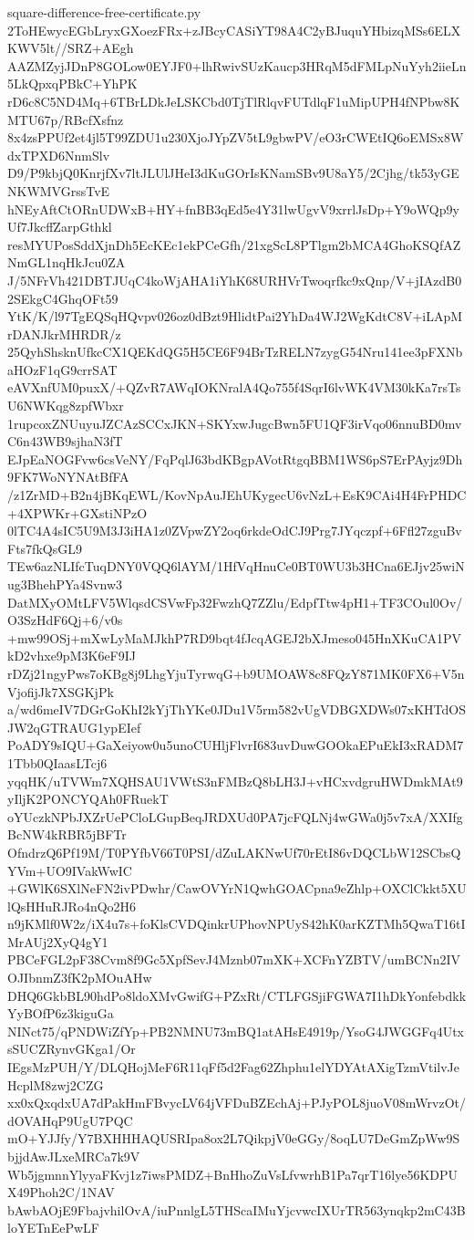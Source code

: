 \documentclass[11pt]{article}
\theoremstyle{definition}
\theoremstyle{remark}
\begin{document}
\begin{filecontents*}[overwrite]{square-difference-free-certificate.py}
2ToHEwycEGbLryxGXoezFRx+zJBcyCASiYT98A4C2yBJuquYHbizqMSs6ELXKWV5lt//SRZ+AEgh
AAZMZyjJDnP8GOLow0EYJF0+lhRwivSUzKaucp3HRqM5dFMLpNuYyh2iieLn5LkQpxqPBkC+YhPK
rD6c8C5ND4Mq+6TBrLDkJeLSKCbd0TjTlRlqvFUTdlqF1uMipUPH4fNPbw8KMTU67p/RBcfXsfnz
8x4zsPPUf2et4jl5T99ZDU1u230XjoJYpZV5tL9gbwPV/eO3rCWEtIQ6oEMSx8WdxTPXD6NnmSlv
D9/P9kbjQ0KnrjfXv7ltJLUlJHeI3dKuGOrIsKNamSBv9U8aY5/2Cjhg/tk53yGENKWMVGrssTvE
hNEyAftCtORnUDWxB+HY+fnBB3qEd5e4Y31lwUgvV9xrrlJsDp+Y9oWQp9yUf7JkcffZarpGthkl
resMYUPosSddXjnDh5EcKEc1ekPCeGfh/21xgScL8PTlgm2bMCA4GhoKSQfAZNmGL1nqHkJcu0ZA
J/5NFrVh421DBTJUqC4koWjAHA1iYhK68URHVrTwoqrfkc9xQnp/V+jIAzdB02SEkgC4GhqOFt59
YtK/K/l97TgEQSqHQvpv026oz0dBzt9HlidtPai2YhDa4WJ2WgKdtC8V+iLApMrDANJkrMHRDR/z
25QyhShsknUfkcCX1QEKdQG5H5CE6F94BrTzRELN7zygG54Nru141ee3pFXNbaHOzF1qG9crrSAT
eAVXnfUM0puxX/+QZvR7AWqIOKNralA4Qo755f4SqrI6lvWK4VM30kKa7rsTsU6NWKqg8zpfWbxr
1rupcoxZNUuyuJZCAzSCCxJKN+SKYxwJugcBwn5FU1QF3irVqo06nnuBD0mvC6n43WB9sjhaN3fT
EJpEaNOGFvw6csVeNY/FqPqlJ63bdKBgpAVotRtgqBBM1WS6pS7ErPAyjz9Dh9FK7WoNYNAtBfFA
/z1ZrMD+B2n4jBKqEWL/KovNpAuJEhUKygecU6vNzL+EsK9CAi4H4FrPHDC+4XPWKr+GXstiNPzO
0lTC4A4sIC5U9M3J3iHA1z0ZVpwZY2oq6rkdeOdCJ9Prg7JYqczpf+6Ffl27zguBvFts7fkQsGL9
TEw6azNLIfcTuqDNY0VQQ6lAYM/1HfVqHnuCe0BT0WU3b3HCna6EJjv25wiNug3BhehPYa4Svnw3
DatMXyOMtLFV5WlqsdCSVwFp32FwzhQ7ZZlu/EdpfTtw4pH1+TF3COul0Ov/O3SzHdF6Qj+6/v0s
+mw99OSj+mXwLyMaMJkhP7RD9bqt4fJcqAGEJ2bXJmeso045HnXKuCA1PVkD2vhxe9pM3K6eF9IJ
rDZj21ngyPws7oKBg8j9LhgYjuTyrwqG+b9UMOAW8c8FQzY871MK0FX6+V5nVjofijJk7XSGKjPk
a/wd6meIV7DGrGoKhI2kYjThYKe0JDu1V5rm582vUgVDBGXDWs07xKHTdOSJW2qGTRAUG1ypEIef
PoADY9sIQU+GaXeiyow0u5unoCUHljFlvrI683uvDuwGOOkaEPuEkI3xRADM71Tbb0QIaasLTcj6
yqqHK/uTVWm7XQHSAU1VWtS3nFMBzQ8bLH3J+vHCxvdgruHWDmkMAt9yIljK2PONCYQAh0FRuekT
oYUczkNPbJXZrUePCloLGupBeqJRDXUd0PA7jcFQLNj4wGWa0j5v7xA/XXIfgBcNW4kRBR5jBFTr
OfndrzQ6Pf19M/T0PYfbV66T0PSI/dZuLAKNwUf70rEtI86vDQCLbW12SCbsQYVm+UO9IVakWwIC
+GWlK6SXlNeFN2ivPDwhr/CawOVYrN1QwhGOACpna9eZhlp+OXClCkkt5XUlQsHHuRJRo4nQo2H6
n9jKMlf0W2z/iX4u7s+foKlsCVDQinkrUPhovNPUyS42hK0arKZTMh5QwaT16tIMrAUj2XyQ4gY1
PBCeFGL2pF38Cvm8f9Gc5XpfSevJ4Mznb07mXK+XCFnYZBTV/umBCNn2IVOJIbnmZ3fK2pMOuAHw
DHQ6GkbBL90hdPo8ldoXMvGwifG+PZxRt/CTLFGSjiFGWA7I1hDkYonfebdkkYyBOfP6z3kiguGa
NINct75/qPNDWiZfYp+PB2NMNU73mBQ1atAHsE4919p/YsoG4JWGGFq4UtxsSUCZRynvGKga1/Or
IEgsMzPUH/Y/DLQHojMeF6R11qFf5d2Fag62Zhphu1elYDYAtAXigTzmVtilvJeHcplM8zwj2CZG
xx0xQxqdxUA7dPakHmFBvycLV64jVFDuBZEchAj+PJyPOL8juoV08mWrvzOt/dOVAHqP9UgU7PQC
mO+YJJfy/Y7BXHHHAQUSRIpa8ox2L7QikpjV0eGGy/8oqLU7DeGmZpWw9SbjjdAwJLxeMRCa7k9V
Wb5jgmnnYlyyaFKvj1z7iwsPMDZ+BnHhoZuVsLfvwrhB1Pa7qrT16lye56KDPUX49Phoh2C/1NAV
bAwbAOjE9FbajvhilOvA/iuPnnlgL5THScaIMuYjcvwcIXUrTR563ynqkp2mC43BloYETnEePwLF

\end{filecontents*}
\end{document}
